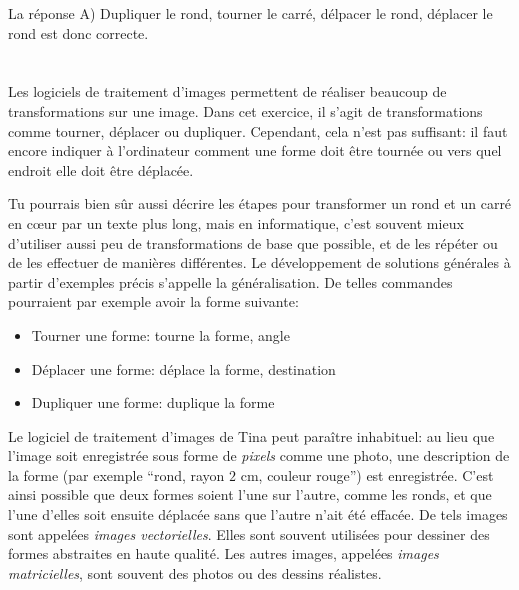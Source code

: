 {{La réponse A) Dupliquer le rond, tourner le carré, délpacer le rond, déplacer le rond est donc correcte.



\section*{\BrochureItsInformatics}
Les logiciels de traitement d’images permettent de réaliser beaucoup de transformations sur une image. Dans cet exercice, il s’agit de transformations comme tourner, déplacer ou dupliquer. Cependant, cela n’est pas suffisant: il faut encore indiquer à l’ordinateur comment une forme doit être tournée ou vers quel endroit elle doit être déplacée.

Tu pourrais bien sûr aussi décrire les étapes pour transformer un rond et un carré en cœur par un texte plus long, mais en informatique, c’est souvent mieux d’utiliser aussi peu de transformations de base que possible, et de les répéter ou de les effectuer de manières différentes. Le développement de solutions générales à partir d’exemples précis s’appelle la généralisation. De telles commandes pourraient par exemple avoir la forme suivante:

\begin{itemize}
  \item Tourner une forme: tourne la forme, angle
  \item Déplacer une forme: déplace la forme, destination
  \item Dupliquer une forme: duplique la forme
\end{itemize}

Le logiciel de traitement d’images de Tina peut paraître inhabituel: au lieu que l’image soit enregistrée sous forme de \emph{pixels} comme une photo, une description de la forme (par exemple “rond, rayon $2$ cm, couleur rouge”) est enregistrée. C’est ainsi possible que deux formes soient l’une sur l’autre, comme les ronds, et que l’une d’elles soit ensuite déplacée sans que l’autre n’ait été effacée. De tels images sont appelées \emph{images vectorielles}. Elles sont souvent utilisées pour dessiner des formes abstraites en haute qualité. Les autres images, appelées \emph{images matricielles}, sont souvent des photos ou des dessins réalistes.



}}
